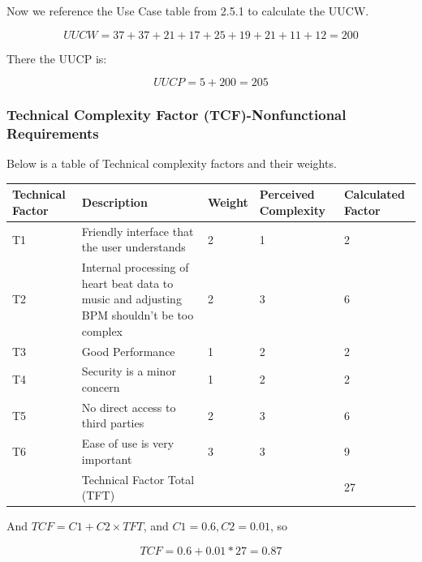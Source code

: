 \documentclass[letterpaper,english, 12pt]{scrreprt}
\begin{document}
Now we reference the Use Case table from 2.5.1 to calculate the UUCW.

\begin{equation}
UUCW = 37 + 37 + 21 + 17 + 25 + 19 + 21 + 11 + 12 = 200
\end{equation}

There the UUCP is:

\begin{equation}
UUCP = 5 + 200 = 205
\end{equation}

\subsubsection{Technical Complexity Factor (TCF)-Nonfunctional Requirements}

Below is a table of Technical complexity factors and their weights.

\begin{center}
        \begin{tabular}{|C{2cm}|C{5cm}|C{1.5cm}|C{2cm}|C{2cm}|}
                \hline
                        Technical Factor & Description & Weight & Perceived Complexity & Calculated Factor \\
                \hline
                        T1 & Friendly interface that the user understands & 2 & 1 & 2 \\
                \hline
                        T2 & Internal processing of heart beat data to music and adjusting BPM shouldn't be too complex & 2 & 3 & 6\\
                \hline
                        T3 & Good Performance & 1 & 2 & 2 \\
                \hline
                        T4 & Security is a minor concern & 1 & 2 & 2 \\
                \hline
                        T5 & No direct access to third parties & 2 & 3 & 6 \\
                \hline
                        T6 & Ease of use is very important & 3 & 3 & 9\\
                \hline   
                        & Technical Factor Total (TFT) & & & 27 \\
                \hline
        \end{tabular}
\end{center}

And $TCF = C1 + C2 \times TFT$, and $C1 = 0.6, C2 = 0.01$, so

\begin{equation}
TCF = 0.6 + 0.01*27 = 0.87
\end{equation}
\end{document}
